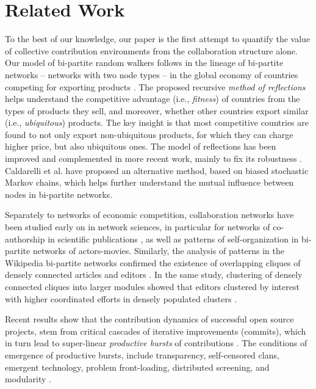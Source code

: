 \section{Related Work}
To the best of our knowledge, our paper is the first attempt to quantify the value of collective contribution environments from the collaboration structure alone. Our model of {bi-partite random walkers} follows in the lineage of bi-partite networks -- networks with two node types -- in the global economy of countries competing for exporting products \cite{hidalgo2007,hidalgo2009}. The proposed recursive {\it method of reflections} helps understand the competitive advantage (i.e., {\it fitness}) of countries from the types of products they sell, and moreover, whether other countries export similar  (i.e., {\it ubiquitous}) products. The key insight is that most competitive countries are found to not only export non-ubiquitous products, for which they can charge higher price, but also ubiquitous ones. The model of reflections has been improved and complemented in more recent work, mainly to fix its robustness \cite{tacchella2012new, cristelli2012competitors, tacchella2013economic, cristelli2013measuring}. Caldarelli et al. \cite{caldarelli2012network} have proposed an alternative method, based on biased stochastic Markov chains, which helps further understand the mutual influence between nodes in bi-partite networks.

Separately to networks of economic competition, collaboration networks have been studied early on in network sciences, in particular for networks of co-authorship in scientific publications \cite{newman2001}, as well as patterns of self-organization in bi-partite networks of actors-movies\cite{ramasco2004self}. Similarly, the analysis of patterns in the Wikipedia bi-partite networks confirmed the existence of overlapping cliques of densely connected articles and editors  \cite{jesus2009}. In the same study, clustering of densely connected cliques into larger modules \cite{guimera2007module} showed that editors clustered by interest with higher coordinated efforts in densely populated clusters \cite{jesus2009}.

Recent results show that the contribution dynamics of successful open source projects, stem from critical cascades of iterative improvements (commits), which in turn lead to super-linear {\it productive bursts} of contributions \cite{sornette2014howmuch}.  The conditions of emergence of productive bursts, include transparency, self-censored clans, emergent technology, problem front-loading, distributed screening, and modularity \cite{vonkrogh2014designing}. 

